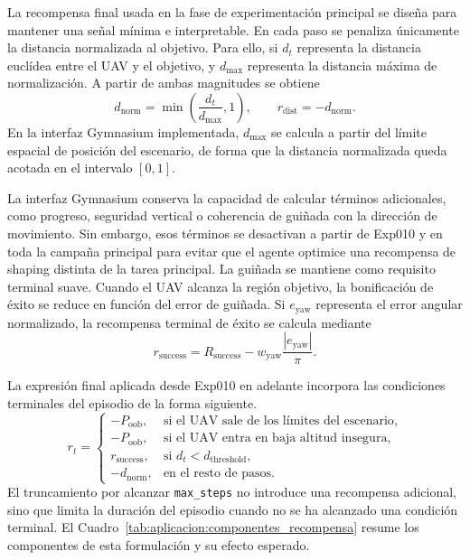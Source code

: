 La recompensa final usada en la fase de experimentación principal se diseña para
mantener una señal mínima e interpretable. En
cada paso se penaliza únicamente la distancia normalizada al objetivo. Para ello, si
$d_t$ representa la distancia euclídea entre el UAV y el objetivo, y
$d_{\max}$ representa la distancia máxima de normalización. A partir de ambas
magnitudes se obtiene
\begin{equation}
    d_{\mathrm{norm}} = \min\left(\frac{d_t}{d_{\max}}, 1\right),
    \qquad
    r_{\mathrm{dist}} = -d_{\mathrm{norm}}.
\end{equation}
En la interfaz Gymnasium implementada, $d_{\max}$ se calcula a partir del límite espacial de
posición del escenario, de forma que la distancia normalizada queda acotada en el
intervalo $[0,1]$.

La interfaz Gymnasium conserva la capacidad de calcular términos adicionales, como progreso,
seguridad vertical o coherencia de guiñada con la dirección de movimiento. Sin
embargo, esos términos se desactivan a partir de Exp010 y en toda la campaña
principal para evitar que el agente optimice una recompensa de shaping distinta
de la tarea principal. La guiñada se mantiene como requisito terminal suave. Cuando el UAV alcanza la
región objetivo, la bonificación de éxito se reduce en función del error de
guiñada. Si
$e_{\mathrm{yaw}}$ representa el error angular normalizado, la recompensa terminal
de éxito se calcula mediante
\begin{equation}
    r_{\mathrm{success}} =
    R_{\mathrm{success}} -
    w_{\mathrm{yaw}} \frac{|e_{\mathrm{yaw}}|}{\pi}.
\end{equation}

La expresión final aplicada desde Exp010 en adelante incorpora las
condiciones terminales del episodio de la forma siguiente.
\begin{equation}
    r_t =
    \begin{cases}
        -P_{\mathrm{oob}}, & \text{si el UAV sale de los límites del escenario},\\
        -P_{\mathrm{oob}}, & \text{si el UAV entra en baja altitud insegura},\\
        r_{\mathrm{success}}, &
            \text{si } d_t < d_{\mathrm{threshold}},\\
        -d_{\mathrm{norm}}, & \text{en el resto de pasos}.
    \end{cases}
\end{equation}
El truncamiento por alcanzar \texttt{max\_steps} no introduce una recompensa
adicional, sino que limita la duración del episodio cuando no se ha alcanzado una
condición terminal. El Cuadro~\ref{tab:aplicacion:componentes_recompensa} resume los
componentes de esta formulación y su efecto esperado.

